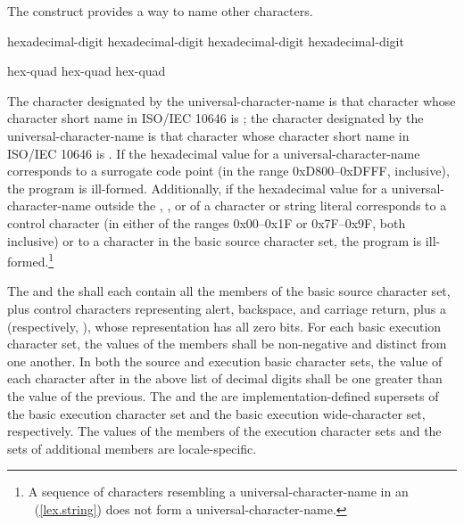 \pnum
The  construct provides a way to name
other characters.

\begin{bnf}
\br
    hexadecimal-digit hexadecimal-digit hexadecimal-digit hexadecimal-digit
\end{bnf}

\begin{bnf}
\br
     hex-quad\br
     hex-quad hex-quad
\end{bnf}

The character designated by the universal-character-name  is that character whose character short name in ISO/IEC 10646 is
; the character designated by the universal-character-name
 is that character whose character short name in
ISO/IEC 10646 is . If the hexadecimal value for a
universal-character-name corresponds to a surrogate code point (in the
range 0xD800--0xDFFF, inclusive), the program is ill-formed. Additionally, if
the hexadecimal value for a universal-character-name outside
the , , or
 of
a character or
string literal corresponds to a control character (in either of the
ranges 0x00--0x1F or 0x7F--0x9F, both inclusive) or to a character in the basic
source character set, the program is ill-formed.\footnote{A sequence of characters resembling a universal-character-name in an
~(\ref{lex.string}) does not form a
universal-character-name.}

\pnum
The  and the  shall each contain all the members of the
basic source character set, plus control characters representing alert,
backspace, and carriage return, plus a 
(respectively, ), whose representation has
all zero bits. For each basic execution character set, the values of the
members shall be non-negative and distinct from one another. In both the
source and execution basic character sets, the value of each character
after  in the above list of decimal digits shall be one greater
than the value of the previous. The 
and the  are
implementation-defined
supersets of the
basic execution character set and the basic execution wide-character
set, respectively. The values of the members of the execution character sets
and the sets of additional members
are locale-specific.%


